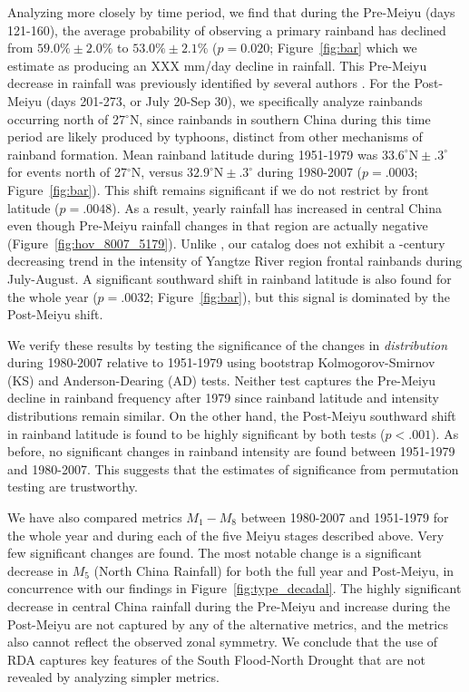 \documentclass[9pt,twocolumn,twoside,lineno]{pnas-new}
\begin{document}
	Analyzing more closely by time period, we find that during the Pre-Meiyu (days 121-160), the average probability of observing a primary rainband has declined from $59.0\% \pm 2.0\%$ to $53.0\% \pm 2.1\%$ ($p=0.020$; Figure~\ref{fig:bar} which we estimate as producing an XXX mm/day decline in rainfall. This Pre-Meiyu decrease in rainfall was previously identified by several authors \citep{Xin2006,Wang2009}. For the Post-Meiyu (days 201-273, or July 20-Sep 30), we specifically analyze rainbands occurring north of 27$^{\circ}$N, since rainbands in southern China during this time period are likely produced by typhoons, distinct from other mechanisms of rainband formation. Mean rainband latitude during 1951-1979 was $33.6^\circ \textrm{N} \pm .3^\circ$ for events north of 27$^{\circ}$N, versus $32.9^\circ \textrm{N} \pm .3^\circ$ during 1980-2007 ($p=.0003$; Figure~\ref{fig:bar}). This shift remains significant if we do not restrict by front latitude ($p=.0048$). As a result, yearly rainfall has increased in central China even though Pre-Meiyu rainfall changes in that region are actually negative (Figure~\ref{fig:hov_8007_5179}). Unlike \citet{Yu2010}, our catalog does not exhibit a -century decreasing trend in the intensity of Yangtze River region frontal rainbands during July-August. A significant southward shift in rainband latitude is also found for the whole year ($p=.0032$; Figure~\ref{fig:bar}), but this signal is dominated by the Post-Meiyu shift.
	
	We verify these results by testing the significance of the changes in \textit{distribution} during 1980-2007 relative to 1951-1979 using bootstrap Kolmogorov-Smirnov (KS) and Anderson-Dearing (AD) tests. Neither test captures the Pre-Meiyu decline in rainband frequency after 1979 since rainband latitude and intensity distributions remain similar. On the other hand, the Post-Meiyu southward shift in rainband latitude is found to be highly significant by both tests ($p<.001$). As before, no significant changes in rainband intensity are found between 1951-1979 and 1980-2007. This suggests that the estimates of significance from permutation testing are trustworthy.
	
	We have also compared metrics $M_1-M_8$ between 1980-2007 and 1951-1979 for the whole year and during each of the five Meiyu stages described above. Very few significant changes are found. The most notable change is a significant decrease in $M_5$ (North China Rainfall) for both the full year and Post-Meiyu, in concurrence with our findings in Figure~\ref{fig:type_decadal}. The highly significant decrease in central China rainfall during the Pre-Meiyu and increase during the Post-Meiyu are not captured by any of the alternative metrics, and the metrics also cannot reflect the observed zonal symmetry. We conclude that the use of RDA captures key features of the South Flood-North Drought that are not revealed by analyzing simpler metrics.
	
\end{document}
